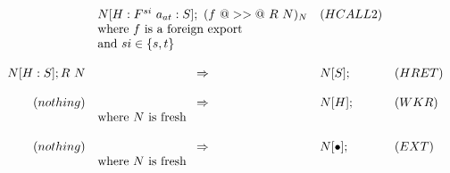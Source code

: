\documentclass{article}
\newcommand{\hcall}{H}
\newcommand{\fcall}[2]{F^{#1}~#2}
\newcommand{\ret}[1]{R~#1}
\begin{document}
$$\begin{array}{rcll}
	& N[\hcall : \fcall{si}{a_{at}} : S]; ~ (f ~@>>@~ \ret{N})_{N} & (HCALL2) \\
	& \multicolumn{2}{l}{\mbox{where $f$ is a foreign export}} \\
	& \multicolumn{2}{l}{\mbox{and}~si \in \{s,t\}} \\
\\
N[\hcall : S]; \ret{N} 
	& \Rightarrow 
	& N[S]; & (HRET) \\
\\
(nothing)
	& \Rightarrow 
	& N[\hcall]; & (WKR) \\
	& \multicolumn{2}{l}{\mbox{where $N$ is fresh}} \\
\\
(nothing)
	& \Rightarrow 
	& N[\bullet]; & (EXT) \\
	& \multicolumn{2}{l}{\mbox{where $N$ is fresh}} \\
\end{array}
$$
\end{document}
